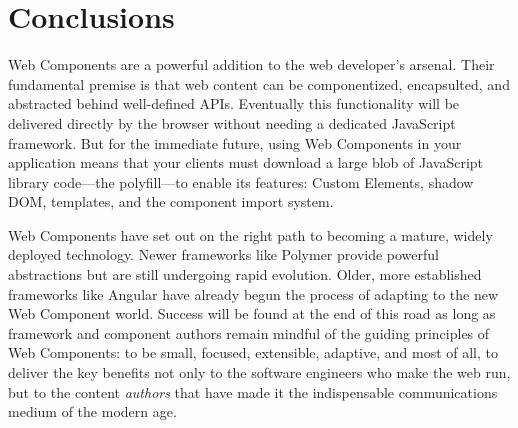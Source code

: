 \chapter{Conclusions}
%

Web Components are a powerful addition to the web developer's arsenal. 
Their fundamental premise is that web content can be componentized, encapsulted, and abstracted behind well-defined APIs.
Eventually this functionality will be delivered directly by the browser without needing a dedicated JavaScript framework.
But for the immediate future, using Web Components in your application means that your clients must download a large blob of JavaScript library code---the polyfill---to enable its features: 
Custom Elements, 
shadow DOM, 
templates, and 
the component import system.

Web Components have set out on the right path to becoming a mature, widely deployed technology. 
Newer frameworks like Polymer provide powerful abstractions but are still undergoing rapid evolution.
Older, more established frameworks like Angular have already begun the process of adapting to the new Web Component world. 
Success will be found at the end of this road as long as framework and component authors remain mindful of the guiding principles of Web Components: 
to be small, focused, extensible, adaptive, 
and most of all, 
to deliver the key benefits 
not only to the software engineers who make the web run,
but to the content \textit{authors} that have made it the indispensable communications medium of the modern age.

